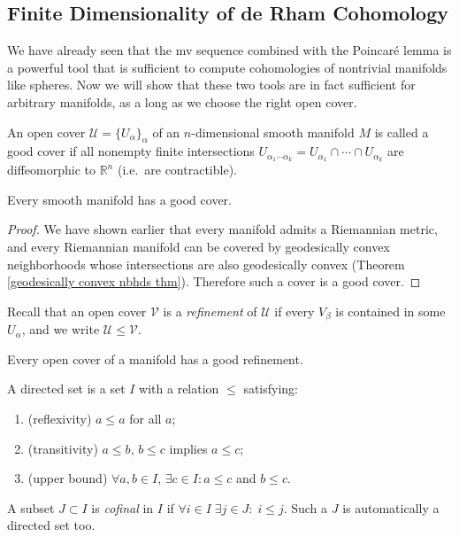 \documentclass[english,letterpaper]{article}%
\numberwithin{equation}{section}
\numberwithin{figure}{section}
\numberwithin{table}{section}
\theoremstyle{definition}
\theoremstyle{definition}
\theoremstyle{definition}
\theoremstyle{plain}
\theoremstyle{plain}
\theoremstyle{plain}
\theoremstyle{plain}
\theoremstyle{remark}
\theoremstyle{remark}
\newcommand{\bbR}{\mathbb{R}}
\newcommand{\calU}{\mathcal{U}}
\newcommand{\calV}{\mathcal{V}}
\renewcommand{\leq}{\leqslant}
\begin{document}
\subsection{Finite Dimensionality of de Rham Cohomology}\label{finite dim de rham}

We have already seen that the \gls{mv} sequence combined with the Poincar\'e lemma is a powerful tool that is sufficient to compute cohomologies of nontrivial manifolds like spheres. Now we will show that these two tools are in fact sufficient for arbitrary manifolds, as a long as we choose the right open cover.

\begin{defn}
    An open cover $\calU=\{U_\alpha\}_\alpha$ of an $n$-dimensional smooth manifold $M$ is called a good cover if all nonempty finite intersections $U_{\alpha_1\cdots\alpha_k}=U_{\alpha_1}\cap \cdots\cap U_{\alpha_k}$ are diffeomorphic to $\bbR^n$ (i.e.\ are contractible).
\end{defn}

\begin{prop}
    Every smooth manifold has a good cover.
\end{prop}
\begin{proof}
     We have shown earlier that every manifold admits a Riemannian metric, and every Riemannian manifold can be covered by geodesically convex neighborhoods whose intersections are also geodesically convex (Theorem \ref{geodesically convex nbhds thm}). Therefore such a cover is a good cover.
\end{proof}

Recall that an open cover $\calV$ is a \emph{refinement} of $\calU$ if every $V_\beta$ is contained in some $U_\alpha$, and we write $\calU\leq \calV$.

\begin{cor}
    Every open cover of a manifold has a good refinement.
\end{cor}

\begin{defn}
    A directed set is a set $I$ with a relation $\leq $ satisfying:
    \begin{enumerate}
        \item (reflexivity) $a\leq a$ for all $a$;
        \item (transitivity) $a\leq b$, $b\leq c$ implies $a\leq c$;
        \item (upper bound) $\forall a,b\in I$, $\exists c\in I: a\leq c$ and $b\leq c$.
    \end{enumerate}
    A subset $J\subset I$ is \emph{cofinal} in $I$ if  $\forall i\in I\; \exists j\in J:\; i\leq j$. Such a $J$ is automatically a directed set too.
\end{defn}
\end{document}

